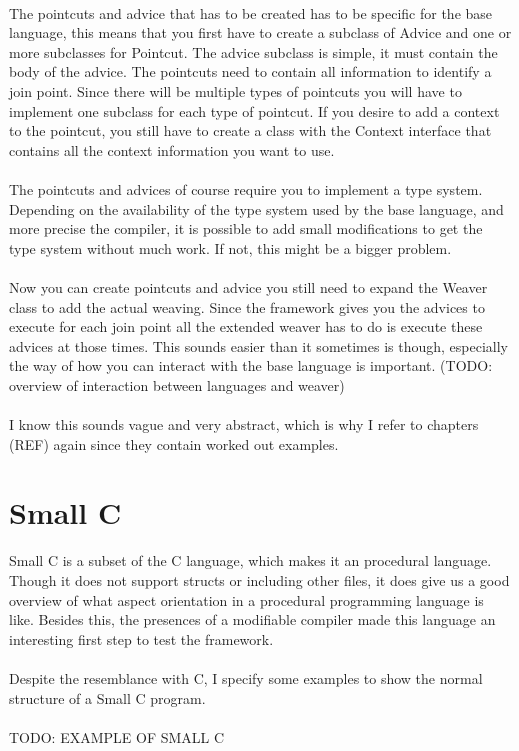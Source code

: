 \documentclass[a4paper]{report}
\begin{document}
\\
The pointcuts and advice that has to be created has to be specific for the base language, this means that you first have to create a subclass of Advice and one or more subclasses for Pointcut.
The advice subclass is simple, it must contain the body of the advice. The pointcuts need to contain all information to identify a join point. Since there will be multiple types of pointcuts you will have to implement one subclass for each type of pointcut. If you desire to add a context to the pointcut, you still have to create a class with the Context interface that contains all the context information you want to use.\\
\\
The pointcuts and advices of course require you to implement a type system. Depending on the availability of the type system used by the base language, and more precise the compiler, it is possible to add small modifications to get the type system without much work. If not, this might be a bigger problem.\\
\\
Now you can create pointcuts and advice you still need to expand the Weaver class to add the actual weaving. Since the framework gives you the advices to execute for each join point all the extended weaver has to do is execute these advices at those times. This sounds easier than it sometimes is though, especially the way of how you can interact with the base language is important. (TODO: overview of interaction between languages and weaver)\\
\\
I know this sounds vague and very abstract, which is why I refer to chapters (REF) again since they contain worked out examples.

\chapter{Small C}
Small C is a subset of the C language, which makes it an procedural language. Though it does not support structs or including other files, it does give us a good overview of what aspect orientation in a procedural programming language is like. Besides this, the presences of a modifiable compiler made this language an interesting first step to test the framework.\\
\\
Despite the resemblance with C, I specify some examples to show the normal structure of a Small C program.\\
\\
TODO: EXAMPLE OF SMALL C
\end{document}

